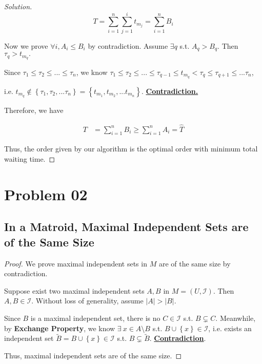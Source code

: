 \documentclass{article}
\newcommand{\set}[1]{\left\{#1\right\}}
\newenvironment{solution}{\begin{proof}[\noindent\it Solution]}{\end{proof}}
\begin{document}
\begin{solution}
    \vspace{-1em}
    $$T = \sum_{i=1}^{n}\sum_{j=1}^{i} t_{m_j} = \sum_{i=1}^{n} B_i$$
    
    \vspace{-0.5em}\hspace{0.5em}
    Now we prove $\forall i, A_i\le B_i$ by contradiction. Assume $\exists q$ s.t. $A_q>B_q$. Then $\tau_{q}>t_{m_q}.$ 
    
    \hspace{3em}
    Since $\tau_1\le\tau_2\le...\le\tau_n$, we know $\tau_1\le\tau_2\le...\le\tau_{q-1}\le t_{m_q}<\tau_q\le\tau_{q+1}\le...\tau_{n}$, 
    
    \hspace{12em}
    i.e. $t_{m_q}\notin\set{\tau_1,\tau_2,...\tau_n}=\set{t_{m_1},t_{m_2},...t_{m_n}}$. \underline{\textbf{Contradiction.}}
    
    \hspace{3em}
    Therefore, we have
    
    \vspace{-2.5em}
    \begin{align*}
        T &= \sum_{i=1}^{n} B_i \geq \sum_{i=1}^{n} A_i = \hat{T}
    \end{align*}
    
    
    \hspace{0.5em}
    Thus, the order given by our algorithm is the optimal order with minimum total waiting time.
\end{solution}

\vspace{1em}
\section{Problem 02}
\vspace{1em}

\subsection{In a Matroid, Maximal Independent Sets are of the Same Size}
\vspace{1em}
\begin{proof}
We prove maximal independent sets in $M$ are of the same size by contradiction.

\hspace{1.3em}
Suppose exist two maximal independent sets $A,B$ in $M=(U,\mathcal{I})$. Then $A,B\in\mathcal{I}$. Without loss of generality, assume $|A|>|B|.$

\hspace{1.3em}
Since $B$ is a maximal independent set, there is no $C\in\mathcal{I}$ s.t. $B\subsetneq C$. Meanwhile, by \textbf{Exchange Property}, we know $\exists\ x\in A\setminus B$ s.t. $B\cup\set{x}\in\mathcal{I}$, i.e. exists an independent set $\widetilde{B}=B\cup\set{x}\in\mathcal{I}$ s.t. $B\subsetneq \widetilde{B}$. \underline{\textbf{Contradiction}}.

\hspace{1.3em}
Thus, maximal independent sets are of the same size.
\end{proof}
\end{document}
